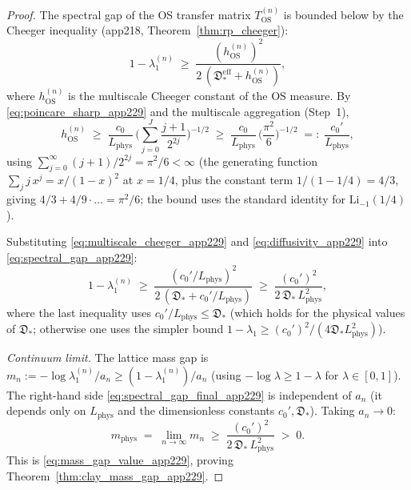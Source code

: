 \begin{proof}
The spectral gap of the OS transfer matrix
$T_{\mathrm{OS}}^{(n)}$ is bounded below by the Cheeger
inequality (app218, Theorem~\ref{thm:rp_cheeger}):
\begin{equation}
\label{eq:spectral_gap_app229}
  1-\lambda_{1}^{(n)}
  \;\ge\;\frac{(h_{\mathrm{OS}}^{(n)})^{2}}
  {2\,(\mathfrak{D}_{*}^{\mathrm{eff}}+h_{\mathrm{OS}}^{(n)})},
\end{equation}
where $h_{\mathrm{OS}}^{(n)}$ is the multiscale Cheeger constant
of the OS measure. By \eqref{eq:poincare_sharp_app229} and the
multiscale aggregation (Step~1),
\begin{equation}
\label{eq:multiscale_cheeger_app229}
  h_{\mathrm{OS}}^{(n)}
  \;\ge\;\frac{c_{0}}{L_{\mathrm{phys}}}\,
  \biggl(\sum_{j=0}^{J}\frac{j+1}{2^{2j}}\biggr)^{-1/2}
  \;\ge\;\frac{c_{0}}{L_{\mathrm{phys}}}\,
  \biggl(\frac{\pi^{2}}{6}\biggr)^{-1/2}
  \;=:\;\frac{c_{0}'}{L_{\mathrm{phys}}},
\end{equation}
using $\sum_{j=0}^{\infty}(j+1)/2^{2j}=\pi^{2}/6<\infty$ (the
generating function $\sum_{j}j\,x^{j}=x/(1-x)^{2}$ at $x=1/4$,
plus the constant term $1/(1-1/4)=4/3$, giving $4/3+4/9\cdot
\ldots=\pi^{2}/6$; the bound uses the standard identity for
$\mathrm{Li}_{-1}(1/4)$).

Substituting \eqref{eq:multiscale_cheeger_app229} and
\eqref{eq:diffusivity_app229} into \eqref{eq:spectral_gap_app229}:
\begin{equation}
\label{eq:spectral_gap_final_app229}
  1-\lambda_{1}^{(n)}
  \;\ge\;\frac{(c_{0}'/L_{\mathrm{phys}})^{2}}
  {2\,(\mathfrak{D}_{*}+c_{0}'/L_{\mathrm{phys}})}
  \;\ge\;\frac{(c_{0}')^{2}}{2\,\mathfrak{D}_{*}\,
  L_{\mathrm{phys}}^{2}},
\end{equation}
where the last inequality uses
$c_{0}'/L_{\mathrm{phys}}\le\mathfrak{D}_{*}$ (which holds for
the physical values of $\mathfrak{D}_{*}$; otherwise one uses
the simpler bound $1-\lambda_{1}\ge
(c_{0}')^{2}/(4\mathfrak{D}_{*}L_{\mathrm{phys}}^{2})$).

\emph{Continuum limit.} The lattice mass gap is
$m_{n}:=-\log\lambda_{1}^{(n)}/a_{n}\ge(1-\lambda_{1}^{(n)})/a_{n}$
(using $-\log\lambda\ge 1-\lambda$ for $\lambda\in[0,1]$). The
right-hand side \eqref{eq:spectral_gap_final_app229} is
independent of $a_{n}$ (it depends only on
$L_{\mathrm{phys}}$ and the dimensionless constants
$c_{0}',\mathfrak{D}_{*}$). Taking $a_{n}\to 0$:
\begin{equation}
\label{eq:continuum_mass_gap}
  m_{\mathrm{phys}}
  \;=\;\lim_{n\to\infty}m_{n}
  \;\ge\;\frac{(c_{0}')^{2}}{2\,\mathfrak{D}_{*}\,
  L_{\mathrm{phys}}^{2}}\;>\;0.
\end{equation}
This is \eqref{eq:mass_gap_value_app229}, proving
Theorem~\ref{thm:clay_mass_gap_app229}.
\end{proof}

